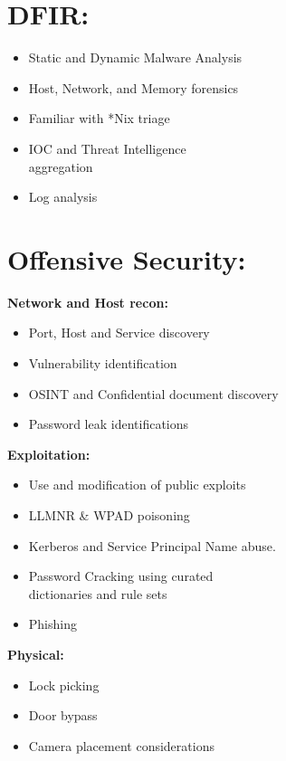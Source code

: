\documentclass[a4paper,10pt]{article}
\begin{document}
\begin{multicols}{2}
\section{DFIR:}

\begin{itemize}[leftmargin=*]
    \item Static and Dynamic Malware Analysis
    \item Host, Network, and Memory forensics
    \item Familiar with *Nix triage
    \item IOC and Threat Intelligence \\ aggregation
    \item Log analysis
\end{itemize}

\columnbreak

\section{Offensive Security:}

\textbf{Network and Host recon:}
\begin{itemize}[leftmargin=*]
    \item Port, Host and Service discovery
    \item Vulnerability identification
    \item OSINT and Confidential document discovery
    \item Password leak identifications
\end{itemize}


\textbf{Exploitation:}
\begin{itemize}[leftmargin=*]
    \item Use and modification of public exploits
    \item LLMNR \& WPAD poisoning
    \item Kerberos and Service Principal Name abuse.
    \item Password Cracking using curated \\ dictionaries and rule sets
    \item Phishing
\end{itemize}
        
\textbf{Physical:}
\begin{itemize}[leftmargin=*]
    \item Lock picking
    \item Door bypass
    \item Camera placement considerations
\end{itemize}


\end{multicols}
\end{document}
